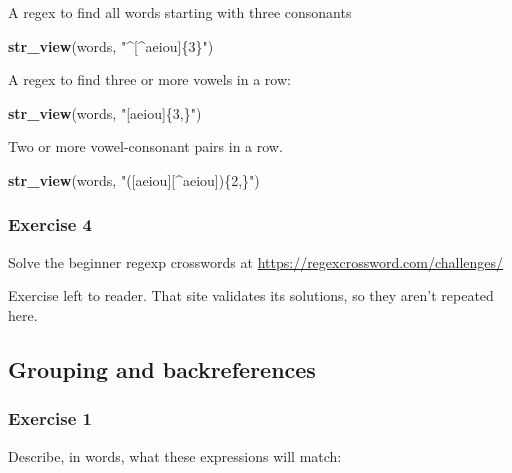 \documentclass[]{book}
\newenvironment{Shaded}{\begin{snugshade}}{\end{snugshade}}
\newcommand{\KeywordTok}[1]{\textcolor[rgb]{0.13,0.29,0.53}{\textbf{#1}}}
\newcommand{\NormalTok}[1]{#1}
\newcommand{\StringTok}[1]{\textcolor[rgb]{0.31,0.60,0.02}{#1}}
\theoremstyle{definition}
\theoremstyle{definition}
\theoremstyle{definition}
\theoremstyle{remark}
\begin{document}
A regex to find all words starting with three consonants

\begin{Shaded}
\begin{Highlighting}[]
\KeywordTok{str_view}\NormalTok{(words, }\StringTok{"^[^aeiou]\{3\}"}\NormalTok{)}
\end{Highlighting}
\end{Shaded}

A regex to find three or more vowels in a row:

\begin{Shaded}
\begin{Highlighting}[]
\KeywordTok{str_view}\NormalTok{(words, }\StringTok{"[aeiou]\{3,\}"}\NormalTok{)}
\end{Highlighting}
\end{Shaded}

Two or more vowel-consonant pairs in a row.

\begin{Shaded}
\begin{Highlighting}[]
\KeywordTok{str_view}\NormalTok{(words, }\StringTok{"([aeiou][^aeiou])\{2,\}"}\NormalTok{)}
\end{Highlighting}
\end{Shaded}

\hypertarget{exercise-4-20}{%
\subsubsection{Exercise 4}\label{exercise-4-20}}

Solve the beginner regexp crosswords at
\url{https://regexcrossword.com/challenges/}

Exercise left to reader. That site validates its solutions, so they
aren't repeated here.

\hypertarget{grouping-and-backreferences}{%
\subsection{Grouping and
backreferences}\label{grouping-and-backreferences}}

\hypertarget{exercise-1-30}{%
\subsubsection{Exercise 1}\label{exercise-1-30}}

Describe, in words, what these expressions will match:
\end{document}
